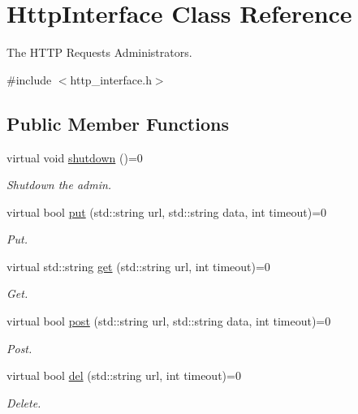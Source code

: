 \hypertarget{classHttpInterface}{\section{Http\-Interface Class Reference}
\label{classHttpInterface}
}


The H\-T\-T\-P Requests Administrators.  




{\ttfamily \#include $<$http\-\_\-interface.\-h$>$}

\subsection*{Public Member Functions}
\begin{DoxyCompactItemize}
\item 
\hypertarget{classHttpInterface_a3ac819dcec45535bf3c0fa614c5bdfce}{virtual void \hyperlink{classHttpInterface_a3ac819dcec45535bf3c0fa614c5bdfce}{shutdown} ()=0}\label{classHttpInterface_a3ac819dcec45535bf3c0fa614c5bdfce}

\begin{DoxyCompactList}\small\item\em Shutdown the admin. \end{DoxyCompactList}\item 
virtual bool \hyperlink{classHttpInterface_a57d393f0886723f1e1efadd56faa2b80}{put} (std\-::string url, std\-::string data, int timeout)=0
\begin{DoxyCompactList}\small\item\em Put. \end{DoxyCompactList}\item 
virtual std\-::string \hyperlink{classHttpInterface_a1304fcad3f7376da136288d280f658d9}{get} (std\-::string url, int timeout)=0
\begin{DoxyCompactList}\small\item\em Get. \end{DoxyCompactList}\item 
virtual bool \hyperlink{classHttpInterface_a089efdf4a6e47e7a13b028e75991439b}{post} (std\-::string url, std\-::string data, int timeout)=0
\begin{DoxyCompactList}\small\item\em Post. \end{DoxyCompactList}\item 
virtual bool \hyperlink{classHttpInterface_acc7539a13d663ba17604acdad6e83bf4}{del} (std\-::string url, int timeout)=0
\begin{DoxyCompactList}\small\item\em Delete. \end{DoxyCompactList}\end{DoxyCompactItemize}


